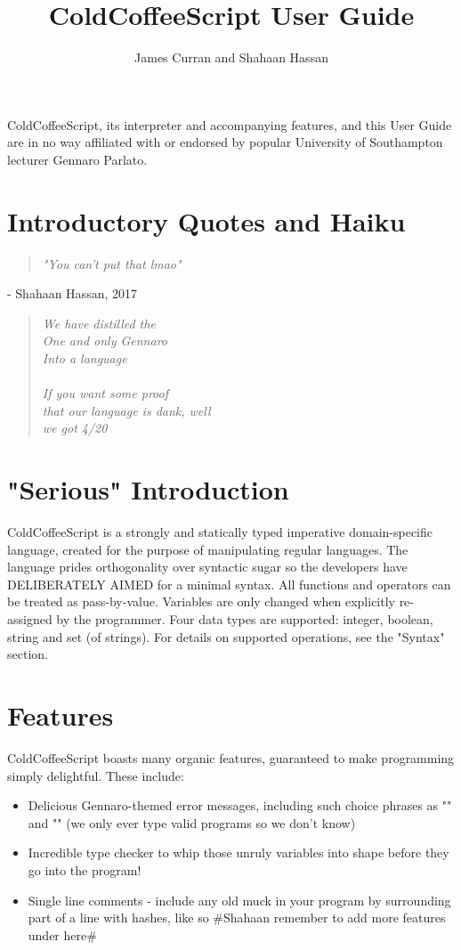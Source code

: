 \documentclass{article}
\author{James Curran and Shahaan Hassan}
\title{ColdCoffeeScript User Guide}
\begin{document}
\maketitle
ColdCoffeeScript, its interpreter and accompanying features, and this User Guide are in no way affiliated with or endorsed by popular University of Southampton lecturer Gennaro Parlato.  
\tableofcontents %

\section{Introductory Quotes and Haiku}
\begin{quote}
\textit{"You can't put that lmao"}
\end{quote}

 - Shahaan Hassan, 2017

\begin{quote}
\textit{We have distilled the\\One and only Gennaro\\Into a language\\\\If you want some proof\\that our language is dank, well\\we got 4/20}
\end{quote}

\section{"Serious" Introduction}
ColdCoffeeScript is a strongly and statically typed imperative domain-specific language, created for the purpose of manipulating regular languages. The language prides orthogonality over syntactic sugar so the developers have DELIBERATELY AIMED for a minimal syntax. All functions and operators can be treated as pass-by-value. Variables are only changed when explicitly re-assigned by the programmer. Four data types are supported: integer, boolean, string and set (of strings). For details on supported operations, see the "Syntax" section.

\section{Features}
ColdCoffeeScript boasts many organic features, guaranteed to make programming simply delightful. These include:
\begin{itemize}
\item Delicious Gennaro-themed error messages, including such choice phrases as "" and "" (we only ever type valid programs so we don't know)
\item Incredible type checker to whip those unruly variables into shape before they go into the program!
\item Single line comments - include any old muck in your program by surrounding part of a line with hashes, like so \#Shahaan remember to add more features under here\#
\end{itemize}
\end{document}
